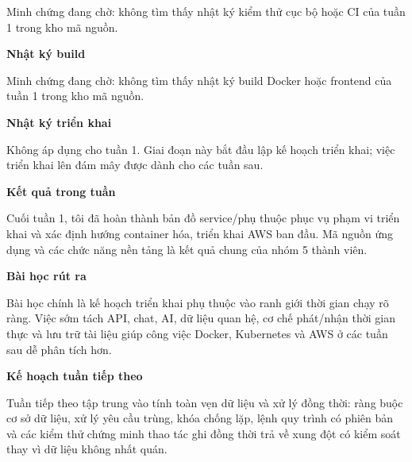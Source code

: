 Minh chứng đang chờ: không tìm thấy nhật ký kiểm thử cục bộ hoặc CI của
tuần 1 trong kho mã nguồn.

\vspace{0.5em}\noindent\textbf{Nhật ký build}\par

Minh chứng đang chờ: không tìm thấy nhật ký build Docker hoặc frontend
của tuần 1 trong kho mã nguồn.

\vspace{0.5em}\noindent\textbf{Nhật ký triển
khai}\par

Không áp dụng cho tuần 1. Giai đoạn này bắt đầu lập kế hoạch triển khai;
việc triển khai lên đám mây được dành cho các tuần sau.

\vspace{0.5em}\noindent\textbf{Kết quả trong tuần}\par

Cuối tuần 1, tôi đã hoàn thành bản đồ service/phụ thuộc phục vụ phạm vi
triển khai và xác định hướng container hóa, triển khai AWS ban đầu. Mã
nguồn ứng dụng và các chức năng nền tảng là kết quả chung của nhóm 5
thành viên.

\vspace{0.5em}\noindent\textbf{Bài học rút ra}\par

Bài học chính là kế hoạch triển khai phụ thuộc vào ranh giới thời gian
chạy rõ ràng. Việc sớm tách API, chat, AI, dữ liệu quan hệ, cơ chế
phát/nhận thời gian thực và lưu trữ tài liệu giúp công việc Docker,
Kubernetes và AWS ở các tuần sau dễ phân tích hơn.

\vspace{0.5em}\noindent\textbf{Kế hoạch tuần tiếp
theo}\par

Tuần tiếp theo tập trung vào tính toàn vẹn dữ liệu và xử lý đồng thời:
ràng buộc cơ sở dữ liệu, xử lý yêu cầu trùng, khóa chống lặp, lệnh quy
trình có phiên bản và các kiểm thử chứng minh thao tác ghi đồng thời trả
về xung đột có kiểm soát thay vì dữ liệu không nhất quán.
